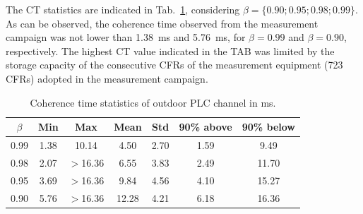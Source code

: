 \documentclass[journal]{IEEEtran}
\begin{document}
	The \ac{CT} statistics are indicated in Tab.~\ref{Tab:EstatisticasCT}, considering $\beta=\{0.90;0.95;0.98;0.99\}$. As can be observed, the coherence time observed from the measurement campaign was not lower than 1.38~ms and 5.76~ms, for $\beta=0.99$ and $\beta = 0.90$, respectively. The highest \ac{CT} value indicated in the TAB was limited by the storage capacity of the consecutive \ac{CFR}s of the measurement equipment (723 \ac{CFR}s) adopted in the measurement campaign.
	
	\begin{table}[!htb]
		\centering
		\caption{Coherence time statistics of outdoor PLC channel in ms.}
		\footnotesize 
		\begin{tabular}{c|c|c|c|c|c|c}
			\hline 
			$\beta$    &  Min    & Max    & Mean    & Std     & 90\% above   & 90\% below \\
			\hline 
			0.99       & 1.38    & 10.14 &  4.50    & 2.70   & 1.59         & 9.49 \\
			\hline
			0.98       & 2.07    & $>$16.36 &  6.55    & 3.83   & 2.49         & 11.70 \\
			\hline
			0.95       & 3.69    & $>$16.36 &  9.84    & 4.56   & 4.10         & 15.27 \\
			\hline
			0.90       & 5.76    & $>$16.36 &  12.28   & 4.21   & 6.18         & 16.36 \\
			\hline
			
		\end{tabular} \label{Tab:EstatisticasCT}
		\newline
	\end{table}  
	
\end{document}
